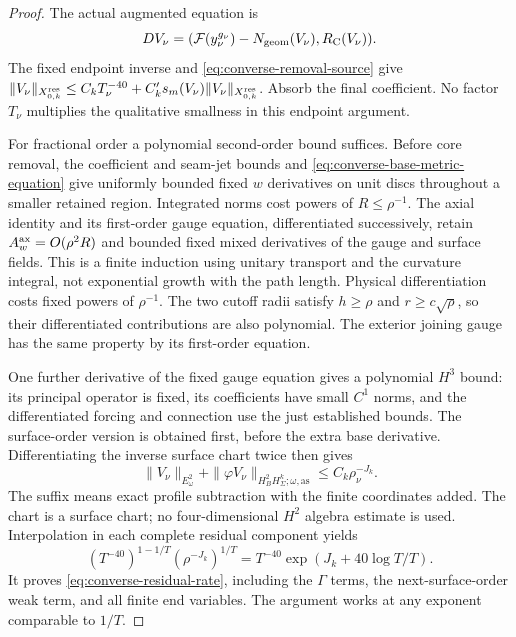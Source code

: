 \documentclass[11pt]{amsart}
\theoremstyle{definition}
\theoremstyle{remark}
\theoremstyle{plain}
\begin{document}
\begin{proof}
The actual augmented equation is
\[
 DV_\nu=(\mathcal F(y_\nu^{g_\nu})-N_{\rm geom}(V_\nu),
                                                R_{\rm C}(V_\nu)).
\]
The fixed endpoint inverse and \eqref{eq:converse-removal-source}
give
$\|V_\nu\|_{X^{\rm res}_{0,k}}\leq
C_kT_\nu^{-40}+C'_ks_m(V_\nu)\|V_\nu\|_{X^{\rm res}_{0,k}}$.
Absorb the final coefficient. No factor $T_\nu$ multiplies
the qualitative smallness in this endpoint argument.

For fractional order a polynomial second-order bound suffices.
Before core removal, the coefficient and seam-jet bounds and
\eqref{eq:converse-base-metric-equation} give uniformly bounded
fixed $w$ derivatives on unit discs throughout a smaller retained
region. Integrated norms cost powers of $R\leq\rho^{-1}$.
The axial identity and its first-order gauge equation, differentiated
successively, retain $A_w^{\rm ax}=O(\rho^2R)$ and bounded
fixed mixed derivatives of the gauge and surface fields.
This is a finite induction using unitary transport and the
curvature integral, not exponential growth with the path length.
Physical differentiation costs fixed powers of $\rho^{-1}$.
The two cutoff radii satisfy $h\geq\rho$ and
$r\geq c\sqrt{\rho}$, so their differentiated contributions
are also polynomial. The exterior joining gauge has the same
property by its first-order equation.

One further derivative of the fixed gauge equation gives a
polynomial $H^3$ bound: its principal operator is fixed, its
coefficients have small $C^1$ norms, and the differentiated
forcing and connection use the just established bounds.
The surface-order version is obtained first, before the extra
base derivative. Differentiating the inverse surface chart twice
then gives
\[
 \|V_\nu\|_{E_\omega^2}
 +\|\varphi V_\nu\|_{H_B^2H_\Sigma^k;\omega,\mathrm{as}}
                                    \leq C_k\rho_\nu^{-J_k}.
\]
The suffix means exact profile subtraction with the finite
coordinates added. The chart is a surface chart; no
four-dimensional $H^2$ algebra estimate is used.
Interpolation in each complete residual component yields
\[
 (T^{-40})^{1-1/T}(\rho^{-J_k})^{1/T}
             =T^{-40}\exp(J_k+40\log T/T).
\]
It proves \eqref{eq:converse-residual-rate}, including the
$\Gamma$ terms, the next-surface-order weak term, and all
finite end variables. The argument works at any exponent
comparable to $1/T$.


\end{proof}
\end{document}
